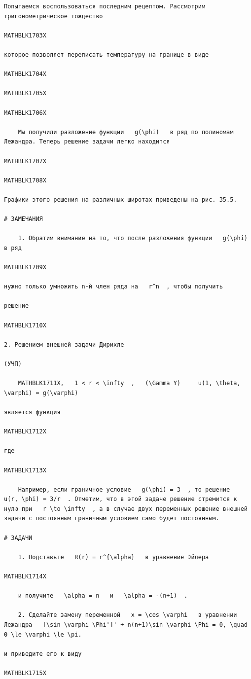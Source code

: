 \documentclass[
]{article}
\begin{document}
\begin{verbatim}
Попытаемся воспользоваться последним рецептом. Рассмотрим тригонометрическое тождество

MATHBLK1703X

которое позволяет переписать температуру на границе в виде

MATHBLK1704X

MATHBLK1705X

MATHBLK1706X

    Мы получили разложение функции   g(\phi)   в ряд по полиномам Лежандра. Теперь решение задачи легко находится

MATHBLK1707X

MATHBLK1708X

Графики этого решения на различных широтах приведены на рис. 35.5.

# ЗАМЕЧАНИЯ

    1. Обратим внимание на то, что после разложения функции   g(\phi)   в ряд

MATHBLK1709X

нужно только умножить n-й член ряда на   r^n  , чтобы получить

решение

MATHBLK1710X

2. Решением внешней задачи Дирихле

(УЧП)

    MATHBLK1711X,   1 < r < \infty  ,   (\Gamma Y)     u(1, \theta, \varphi) = g(\varphi)

является функция

MATHBLK1712X

где

MATHBLK1713X

    Например, если граничное условие   g(\phi) = 3  , то решение   u(r, \phi) = 3/r  . Отметим, что в этой задаче решение стремится к нулю при   r \to \infty  , а в случае двух переменных решение внешней задачи с постоянным граничным условием само будет постоянным.

# ЗАДАЧИ

    1. Подставьте   R(r) = r^{\alpha}   в уравнение Эйлера

MATHBLK1714X

    и получите   \alpha = n   и   \alpha = -(n+1)  .

    2. Сделайте замену переменной   x = \cos \varphi   в уравнении Лежандра   [\sin \varphi \Phi']' + n(n+1)\sin \varphi \Phi = 0, \quad 0 \le \varphi \le \pi. 

и приведите его к виду

MATHBLK1715X


\end{verbatim}
\end{document}
